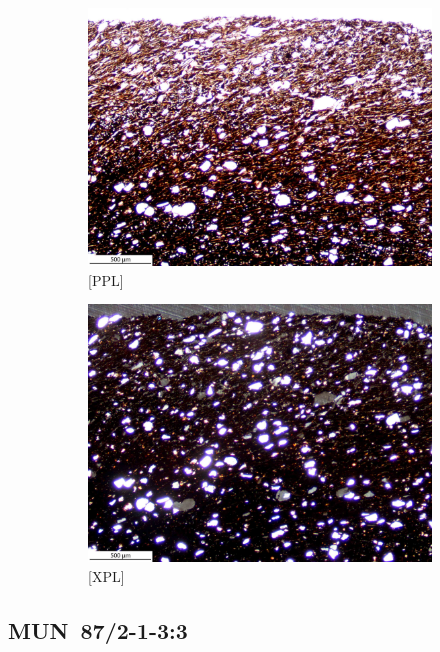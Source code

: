 \documentclass[a4paper]{article}
\begin{document}
\begin{figure}[H]
	\centering
	\begin{subfigure}[t]{.49\textwidth}
		\includegraphics[width=\textwidth]{ThinSections/100-1_4x_PPL.jpg}
		\caption{[PPL]}
	\end{subfigure}\hspace{.5em}\hfill
	\begin{subfigure}[t]{.49\textwidth}
		\includegraphics[width=\textwidth]{ThinSections/100-1_4x_XPL.jpg}
		\caption{[XPL]}
	\end{subfigure}
	\caption{}
	\label{fig:100_mun}
\end{figure}

\newpage\subsection{MUN~87/2-1-3:3 \citep[mun\#102; Fig.~\ref{fig:mun.pottery}.9; Pikunda-Munda style;][473 Pl.~92.5]{Seidensticker.2021e}}
\end{document}
